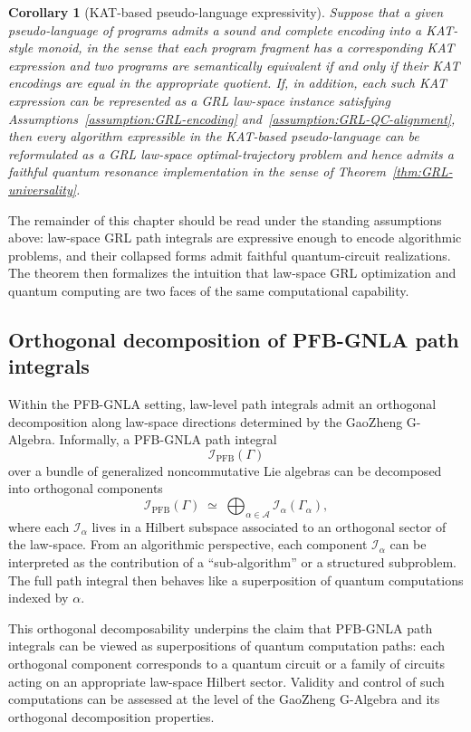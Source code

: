 \documentclass[11pt]{book}
\theoremstyle{plain}
\newtheorem{corollary}[theorem]{Corollary}
\theoremstyle{definition}
\theoremstyle{remark}
\begin{document}
\begin{corollary}[KAT-based pseudo-language expressivity]
Suppose that a given \\pseudo-language of programs admits a sound and
complete encoding into a KAT-style monoid, in the sense that each
program fragment has a corresponding KAT expression and two programs
are semantically equivalent if and only if their KAT encodings are
equal in the appropriate quotient. If, in addition, each such KAT
expression can be represented as a GRL law-space instance satisfying
Assumptions~\ref{assumption:GRL-encoding}
and~\ref{assumption:GRL-QC-alignment}, then every algorithm expressible
in the KAT-based pseudo-language can be reformulated as a GRL
law-space optimal-trajectory problem and hence admits a faithful
quantum resonance implementation in the sense of
Theorem~\ref{thm:GRL-universality}.
\end{corollary}

The remainder of this chapter should be read under the standing
assumptions above: law-space GRL path integrals are expressive enough to
encode algorithmic problems, and their collapsed forms admit faithful
quantum-circuit realizations. The theorem then formalizes the intuition
that law-space GRL optimization and quantum computing are two faces of
the same computational capability.

\subsection{Orthogonal decomposition of PFB-GNLA path integrals}

Within the PFB-GNLA setting, law-level path integrals admit an orthogonal
decomposition along law-space directions determined by the GaoZheng
G-Algebra. Informally, a PFB-GNLA path integral
\[
  \mathcal{I}_{\mathrm{PFB}}(\Gamma)
\]
over a bundle of generalized noncommutative Lie algebras can be decomposed
into orthogonal components
\[
  \mathcal{I}_{\mathrm{PFB}}(\Gamma)
  \;\simeq\;
  \bigoplus_{\alpha\in\mathcal{A}}
    \mathcal{I}_\alpha(\Gamma_\alpha),
\]
where each $\mathcal{I}_\alpha$ lives in a Hilbert subspace associated to
an orthogonal sector of the law-space. From an algorithmic perspective,
each component $\mathcal{I}_\alpha$ can be interpreted as the contribution
of a ``sub-algorithm'' or a structured subproblem. The full path integral
then behaves like a superposition of quantum computations indexed by
$\alpha$.

This orthogonal decomposability underpins the claim that PFB-GNLA path
integrals can be viewed as superpositions of quantum computation paths:
each orthogonal component corresponds to a quantum circuit or a family of
circuits acting on an appropriate law-space Hilbert sector. Validity and
control of such computations can be assessed at the level of the
GaoZheng G-Algebra and its orthogonal decomposition properties.
\end{document}
